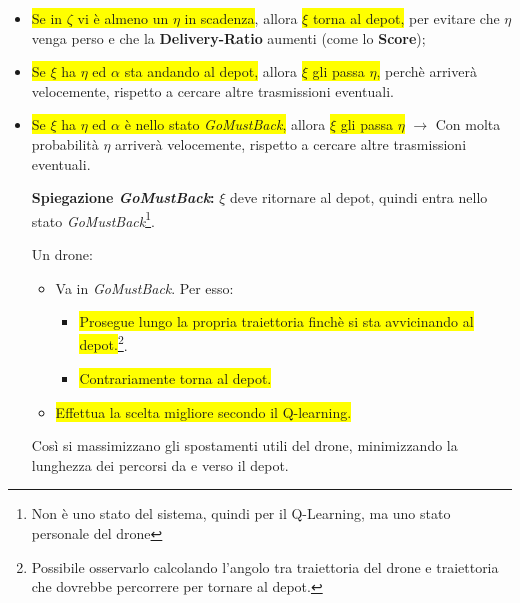 \documentclass[12pt]{article}
\begin{document}
\begin{itemize}

    \item \colorbox{yellow}{Se in $\zeta$ vi è almeno un $\eta$ in scadenza}, allora \colorbox{yellow}{$\xi$ torna al depot,} per evitare che $\eta$ venga perso e che la \textbf{Delivery-Ratio} aumenti (come lo \textbf{Score});

    \item \colorbox{yellow}{Se $\xi$ ha $\eta$ ed $\alpha$ sta andando al depot,} allora \colorbox{yellow}{$\xi$ gli passa $\eta$,} perchè arriverà velocemente, rispetto a cercare altre trasmissioni eventuali.
    
    \item  \colorbox{yellow}{Se $\xi$ ha $\eta$ ed $\alpha$ è nello stato \textit{GoMustBack},} allora \colorbox{yellow}{$\xi$ gli passa $\eta$} $\rightarrow$ Con molta probabilità $\eta$ arriverà velocemente, rispetto a cercare altre trasmissioni eventuali.
    
    \textbf{Spiegazione \textit{GoMustBack}:} $\xi$ deve ritornare al depot, quindi entra nello stato \textit{GoMustBack}\footnote{Non è uno stato del sistema, quindi per il Q-Learning, ma uno stato personale del drone}.
    
    Un drone:
    
    \begin{itemize}
    
        \item Va in \textit{GoMustBack}. Per esso: 
    
        \begin{itemize}
        
            \item \colorbox{yellow}{Prosegue lungo la propria traiettoria finchè si sta avvicinando al depot.}\footnote{Possibile osservarlo calcolando l'angolo tra traiettoria del drone e traiettoria che dovrebbe percorrere per tornare al depot.}.
            
            \item \colorbox{yellow}{Contrariamente torna al depot.}
        
        \end{itemize}
    
        \item \colorbox{yellow}{Effettua la scelta migliore secondo il Q-learning.}
    
    \end{itemize}
    
    Così si massimizzano gli spostamenti utili del drone, minimizzando la lunghezza dei percorsi da e verso il depot.
    
 
    
\end{itemize}
\end{document}
